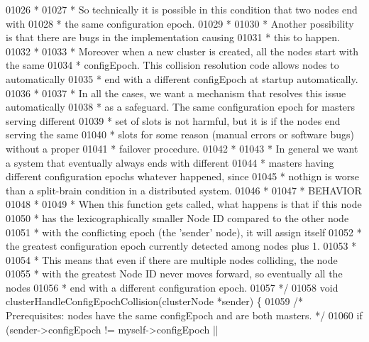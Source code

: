 \begin{DoxyCode}
{{{{{{{{{{{{{01026 \textcolor{comment}{ *}
01027 \textcolor{comment}{ * So technically it is possible in this condition that two nodes end with}
01028 \textcolor{comment}{ * the same configuration epoch.}
01029 \textcolor{comment}{ *}
01030 \textcolor{comment}{ * Another possibility is that there are bugs in the implementation causing}
01031 \textcolor{comment}{ * this to happen.}
01032 \textcolor{comment}{ *}
01033 \textcolor{comment}{ * Moreover when a new cluster is created, all the nodes start with the same}
01034 \textcolor{comment}{ * configEpoch. This collision resolution code allows nodes to automatically}
01035 \textcolor{comment}{ * end with a different configEpoch at startup automatically.}
01036 \textcolor{comment}{ *}
01037 \textcolor{comment}{ * In all the cases, we want a mechanism that resolves this issue automatically}
01038 \textcolor{comment}{ * as a safeguard. The same configuration epoch for masters serving different}
01039 \textcolor{comment}{ * set of slots is not harmful, but it is if the nodes end serving the same}
01040 \textcolor{comment}{ * slots for some reason (manual errors or software bugs) without a proper}
01041 \textcolor{comment}{ * failover procedure.}
01042 \textcolor{comment}{ *}
01043 \textcolor{comment}{ * In general we want a system that eventually always ends with different}
01044 \textcolor{comment}{ * masters having different configuration epochs whatever happened, since}
01045 \textcolor{comment}{ * nothign is worse than a split-brain condition in a distributed system.}
01046 \textcolor{comment}{ *}
01047 \textcolor{comment}{ * BEHAVIOR}
01048 \textcolor{comment}{ *}
01049 \textcolor{comment}{ * When this function gets called, what happens is that if this node}
01050 \textcolor{comment}{ * has the lexicographically smaller Node ID compared to the other node}
01051 \textcolor{comment}{ * with the conflicting epoch (the 'sender' node), it will assign itself}
01052 \textcolor{comment}{ * the greatest configuration epoch currently detected among nodes plus 1.}
01053 \textcolor{comment}{ *}
01054 \textcolor{comment}{ * This means that even if there are multiple nodes colliding, the node}
01055 \textcolor{comment}{ * with the greatest Node ID never moves forward, so eventually all the nodes}
01056 \textcolor{comment}{ * end with a different configuration epoch.}
01057 \textcolor{comment}{ */}
01058 \textcolor{keywordtype}{void} clusterHandleConfigEpochCollision(clusterNode *sender) \{
01059     \textcolor{comment}{/* Prerequisites: nodes have the same configEpoch and are both masters. */}
01060     \textcolor{keywordflow}{if} (sender->configEpoch != myself->configEpoch ||
}}}}}}}}}}}}}
\end{DoxyCode}
